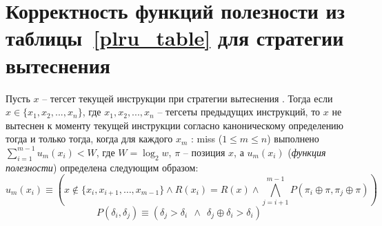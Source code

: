 \section*{Корректность функций полезности из таблицы~\ref{plru_table}
для стратегии вытеснения \PseudoLRU}
\begin{lemma}\label{lemma_plru_hit''}
Пусть $x$ -- тегсет текущей инструкции при стратегии вытеснения
\PseudoLRU. Тогда если %
$x \in \{x_1, x_2, ..., x_n\}$, где $x_1, x_2, ..., x_n$ -- тегсеты
предыдущих инструкций, то $x$ не вытеснен к моменту текущей
инструкции согласно каноническому определению \PseudoLRU тогда и
только тогда, когда для каждого $x_m$ : miss ($1 \leqslant m
\leqslant n$) выполнено $\sum^{m-1}_{i=1} u_m(x_i) < W$, где $W =
\log_2 w$, $\pi$ -- позиция $x$, а $u_m(x_i)$ (\emph{функция
полезности}) определена следующим образом:
$$u_m(x_i) \equiv
    (x \notin \{x_i, x_{i+1}, \dots, x_{m-1}\} \wedge R(x_i) = R(x) \wedge \bigwedge_{j=i+1}^{m-1} P(\pi_i \oplus \pi,
       \pi_j \oplus \pi))$$
$$P(\delta_i, \delta_j) \equiv (\delta_j > \delta_i~~\wedge~~\delta_j \oplus \delta_i > \delta_i)$$
\end{lemma}
